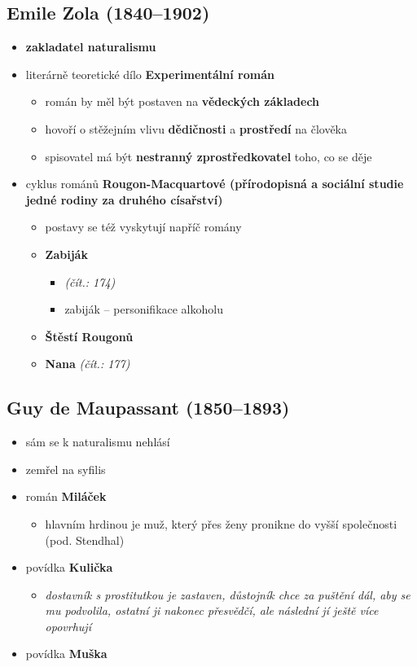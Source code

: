 \subsection{Emile Zola (1840--1902)}
\begin{itemize}
\item \textbf{zakladatel naturalismu}
\item literárně teoretické dílo \textbf{Experimentální román}
	\begin{itemize}
	\item román by měl být postaven na \textbf{vědeckých základech}
	\item hovoří o stěžejním vlivu \textbf{dědičnosti} a \textbf{prostředí} na člověka
	\item spisovatel má být \textbf{nestranný zprostředkovatel} toho, co se děje
	\end{itemize}
\item cyklus románů \textbf{Rougon-Macquartové (přírodopisná a sociální studie jedné rodiny za druhého císařství)}
	\begin{itemize}
	\item postavy se též vyskytují napříč romány
	\item \textbf{Zabiják}
		\begin{itemize}
		\item \textit{(čít.: 174)}
		\item zabiják -- personifikace alkoholu
		\end{itemize}
	\item \textbf{Štěstí Rougonů}
	\item \textbf{Nana} \textit{(čít.: 177)}
	\end{itemize}
\end{itemize}

\subsection{Guy de Maupassant (1850--1893)}
\begin{itemize}
\item sám se k naturalismu nehlásí
\item zemřel na syfilis
\item román \textbf{Miláček}
	\begin{itemize}
	\item hlavním hrdinou je muž, který přes ženy pronikne do vyšší společnosti (pod. Stendhal)
	\end{itemize}
\item povídka \textbf{Kulička}
	\begin{itemize}
	\item \textit{dostavník s prostitutkou je zastaven, důstojník chce za puštění dál, aby se mu podvolila, ostatní ji nakonec přesvědčí, ale následní jí ještě více opovrhují}
	\end{itemize}
\item povídka \textbf{Muška}
\end{itemize}

